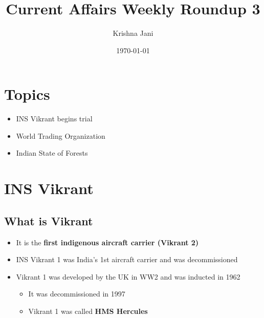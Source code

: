 \documentclass[11pt]{article}
\author{Krishna Jani}
\date{\today}
\title{Current Affairs Weekly Roundup 3}
\begin{document}
\maketitle
\tableofcontents


\section{Topics}
\label{sec:org5c142c6}
\begin{itemize}
\item INS Vikrant begins trial
\item World Trading Organization
\item Indian State of Forests
\end{itemize}

\section{INS Vikrant}
\label{sec:orgbbd44eb}

\subsection{What is Vikrant}
\label{sec:orge6d9c18}
\begin{itemize}
\item It is the \textbf{first indigenous aircraft carrier (Vikrant 2)}
\item INS Vikrant 1 was India's 1st aircraft carrier and was decommissioned
\item Vikrant 1 was developed by the UK in WW2 and was inducted in 1962
\begin{itemize}
\item It was decommissioned in 1997
\item Vikrant 1 was called \textbf{HMS Hercules}
\end{itemize}
\end{itemize}
\end{document}
